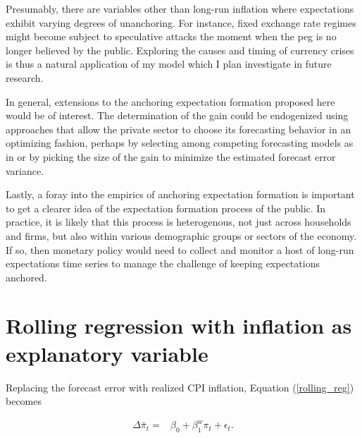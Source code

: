 \documentclass[11pt]{article}
\def \myBibPath {../../literature/}
\renewcommand{\[}{\begin{equation}}
\renewcommand{\]}{\end{equation}}
\begin{document}
Presumably, there are variables other than long-run inflation where expectations exhibit varying degrees of unanchoring. For instance, fixed exchange rate regimes might become subject to speculative attacks the moment when the peg is no longer believed by the public. Exploring the causes and timing of currency crises is thus a natural application of my model which I plan investigate in future research. 


In general, extensions to the anchoring expectation formation proposed here would be of interest. The determination of the gain could be endogenized using approaches that allow the private sector to choose its forecasting behavior in an optimizing fashion, perhaps by selecting among competing forecasting models as in \cite{Branch2011} or by picking the size of the gain to minimize the estimated forecast error variance. 

Lastly, a foray into the empirics of anchoring expectation formation is important to get a clearer idea of the expectation formation process of the public. In practice, it is likely that this process is heterogenous, not just across households and firms, but also within various demographic groups or sectors of the economy. If so, then monetary policy would need to collect and monitor a host of long-run expectations time series to manage the challenge of keeping expectations anchored. 



\clearpage
\newpage



\newpage
\appendix


\section{Rolling regression with inflation as explanatory variable}\label{app_rolling_pi}

Replacing the forecast error with realized CPI inflation, Equation (\ref{rolling_reg}) becomes 

\begin{align*}
\Delta\bar{\pi}_t = & \beta_0 + \beta^w_1 \pi_t + \epsilon_t. 
\label{rolling_reg_pi}
\end{align*}
\end{document}

